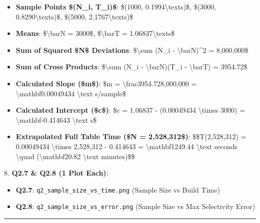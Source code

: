 \documentclass[11pt,a4paper]{article}
\begin{document}
\begin{itemize}
\item \textbf{Sample Points \$(N\_i, T\_i)\$}: \$(1000, 0.1994\textbackslash{}text{s})\$, \$(3000, 0.8290\textbackslash{}text{s})\$, \$(5000, 2.1767\textbackslash{}text{s})\$
\item \textbf{Means}: \$\textbackslash{}bar{N} = 3000\$, \$\textbackslash{}bar{T} = 1.06837\textbackslash{}text{s}\$
\item \textbf{Sum of Squared \$N\$ Deviations}: \$\textbackslash{}sum (N\_i - \textbackslash{}bar{N})\textasciicircum{}2 = 8,000,000\$
\item \textbf{Sum of Cross Products}: \$\textbackslash{}sum (N\_i - \textbackslash{}bar{N})(T\_i - \textbackslash{}bar{T}) = 3954.72\$
\item \textbf{Calculated Slope (\$m\$)}: \$m = \textbackslash{}frac{3954.72}{8,000,000} = \textbackslash{}mathbf{0.00049434 \textbackslash{}text{ s/sample}}\$
\item \textbf{Calculated Intercept (\$c\$)}: \$c = 1.06837 - (0.00049434 \textbackslash{}times 3000) = \textbackslash{}mathbf{-0.414643 \textbackslash{}text{ s}}\$
\item \textbf{Extrapolated Full Table Time (\$N = 2,528,312\$)}:
\$\$T(2,528,312) = 0.00049434 \textbackslash{}times 2,528,312 - 0.414643 = \textbackslash{}mathbf{1249.44 \textbackslash{}text{ seconds}} \textbackslash{}quad (\textbackslash{}mathbf{20.82 \textbackslash{}text{ minutes}})\$\$

\end{itemize}

8. \textbf{Q2.7 \& Q2.8 (1 Plot Each)}:

\begin{itemize}
\item \textbf{Q2.7}: \texttt{q2\_sample\_size\_vs\_time.png} (Sample Size vs Build Time)
\item \textbf{Q2.8}: \texttt{q2\_sample\_size\_vs\_error.png} (Sample Size vs Max Selectivity Error)
\end{itemize}

\hrule
\end{document}
